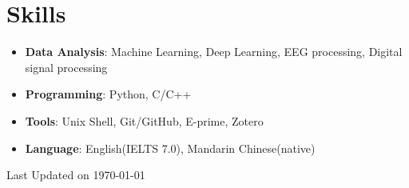 \documentclass[letterpaper,11pt]{article}
\begin{document}
\section{Skills}
    \vspace{2pt}
    \begin{itemize}[leftmargin=0.15in, label={}]
    \item \textbf{Data Analysis}: Machine Learning, Deep Learning, EEG processing, Digital signal processing \\
    \vspace{-4pt}
    \item \textbf{Programming}: Python, C/C++\\
    \vspace{-4pt}
    \item \textbf{Tools}{: Unix Shell, Git/GitHub, E-prime, Zotero}  \\
    \vspace{-4pt}
    \item \textbf{Language}: English(IELTS 7.0), Mandarin Chinese(native)
    \end{itemize}
    \vspace{-30pt}

\begin{flushright}
  \color{gray}
  \item Last Updated on \today%
\end{flushright}
\end{document}
